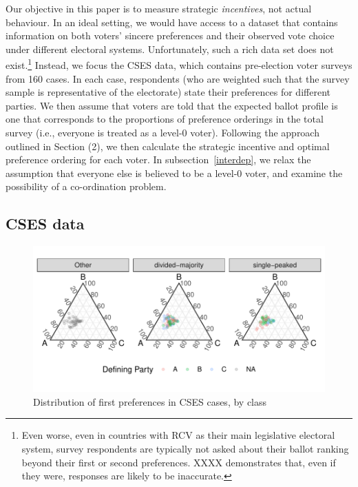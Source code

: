 \documentclass[12pt, letter, margin = 1.5 in]{article}
\begin{document}
Our objective in this paper is to measure strategic \emph{incentives}, not actual behaviour. In an ideal setting, we would have access to a dataset that contains information on both voters' sincere preferences and their observed vote choice under different electoral systems. Unfortunately, such a rich data set does not exist.\footnote{Even worse, even in countries with RCV as their main legislative electoral system, survey respondents are typically not asked about their ballot ranking beyond their first or second preferences. XXXX demonstrates that, even if they were, responses are likely to be inaccurate.} Instead, we focus the CSES data, which contains pre-election voter surveys from 160 cases. In each case, respondents (who are weighted such that the survey sample is representative of the electorate) state their preferences for different parties. We then assume that voters are told that the expected ballot profile is one that corresponds to the proportions of preference orderings in the total survey (i.e., everyone is treated as a level-0 voter). Following the approach outlined in Section (2), we then calculate the strategic incentive and optimal preference ordering for each voter. In subsection~\ref{interdep}, we relax the assumption that everyone else is believed to be a level-0 voter, and examine the possibility of a co-ordination problem.

\subsection{CSES data}




\begin{figure}[!htb]
	\centering
	\includegraphics[width = \textwidth]{../output/figures/cses_fp.pdf}
	\caption{Distribution of first preferences in CSES cases, by class}
	\label{fig:cses_fp}
\end{figure}
\end{document}
